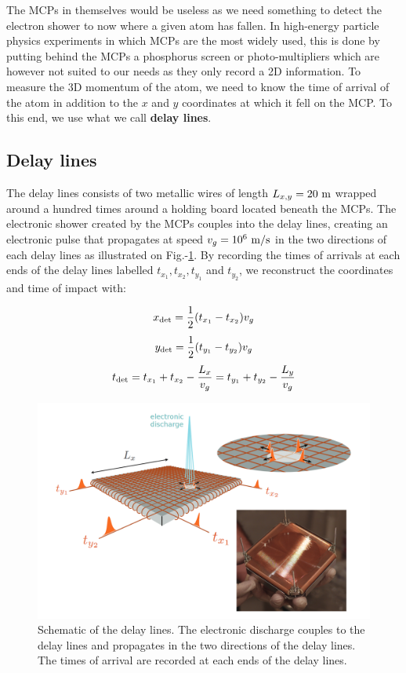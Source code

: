 The MCPs in themselves would be useless as we need something to detect the electron shower to now where a given atom has fallen. In high-energy particle physics experiments in which MCPs are the most widely used, this is done by putting behind the MCPs a phosphorus screen or photo-multipliers which are however not suited to our needs as they only record a 2D information. To measure the 3D momentum of the atom, we need to know the time of arrival of the atom in addition to the $x$ and $y$ coordinates at which it fell on the MCP. To this end, we use what we call \textbf{delay lines}.

\subsection{Delay lines}

The delay lines consists of two metallic wires of length $L_{x,y}=20 \ \rm{m}$ wrapped around a hundred times around a holding board located beneath the MCPs. The electronic shower created by the MCPs couples into the delay lines, creating an electronic pulse that propagates at speed $v_g=10^6 \ \rm{m/s}$ in the two directions of each delay lines as illustrated on Fig.-\ref{fig:delay_lines}. By recording the times of arrivals at each ends of the delay lines labelled $t_{x_1},t_{x_2},t_{y_1}$ and $t_{y_2}$, we reconstruct the coordinates and time of impact with:


\begin{equation}
    x_{\rm{det}}=\frac{1}{2} (t_{x_1}-t_{x_2})v_g
\end{equation}
\begin{equation}
    y_{\rm{det}}=\frac{1}{2} (t_{y_1}-t_{y_2})v_g
\end{equation}
\begin{equation}
    t_{\rm{det}}=t_{x_{1}}+t_{x_{2}}-\frac{L_{x}}{v_{g}}=t_{y_{1}}+t_{y_{2}}-\frac{L_{y}}{v_{g}}
    \label{eq:tdet_MCP}
\end{equation}

\begin{figure}[ht!]
    \centering
    \includegraphics[width=\textwidth]{Fig/Chapter3/delay_lines.png}
    \caption{Schematic of the delay lines. The electronic discharge couples to the delay lines and propagates in the two directions of the delay lines. The times of arrival are recorded at each ends of the delay lines.}
    \label{fig:delay_lines}
\end{figure}


